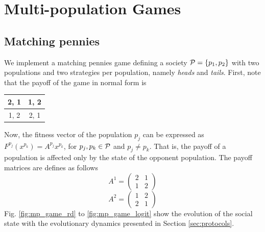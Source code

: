 
 \FloatBarrier
\section{Multi-population Games}\label{sec:multi-pop}




\subsection{Matching pennies}

We implement a matching pennies game defining a society $\mathcal{P} = \{p_1, p_2\}$ with two populations and two strategies per population, namely \emph{heads} and \emph{tails}. First, note that the payoff of the game in normal form is
%
\begin{table}[H]
\centering
 \begin{tabular}{|c|c|} \hline
  2, 1 & 1, 2 \\ \hline
  1, 2 & 2, 1 \\ \hline
 \end{tabular}
\end{table}
%
Now, the fitness vector of the  population $p_j$ can be expressed as $F^{p_j}(x^{p_k}) = A^{p_j} x^{p_k}$, for $p_j, p_k \in \mathcal{P}$ and $p_j \neq p_k$. That is, the payoff of a population is affected only by the state of the opponent population.
The payoff matrices are defines as follows
%
\begin{equation}
  A^1 = \begin{pmatrix}
2 & 1 \\
1 & 2 
  \end{pmatrix}
\end{equation}
%
\begin{equation}
  A^2 = \begin{pmatrix}
  1 & 2 \\
  2 & 1 
  \end{pmatrix}
\end{equation}
%
Fig. \ref{fig:mp_game_rd} to \ref{fig:mp_game_logit} show the evolution of the social state with the evolutionary dynamics presented in Section \ref{sec:protocols}. 

